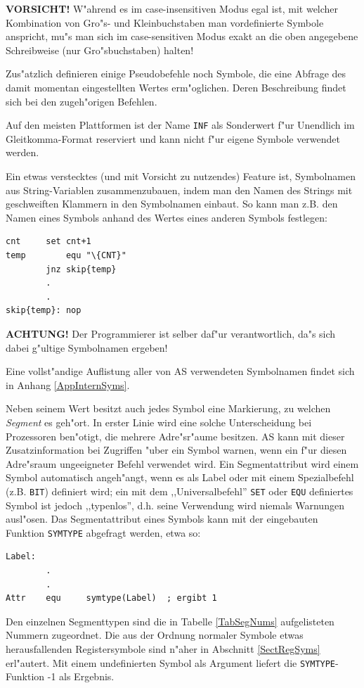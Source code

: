 \documentclass[12pt,a4paper,twoside]{report}
\newcommand{\bb}[1]{{\bf #1}}
\newcommand{\tty}[1]{{\tt #1}}
\newcommand{\asname}{AS}
\begin{document}
\bb{VORSICHT!}  W"ahrend es im case-insensitiven Modus egal ist,
mit welcher Kombination von Gro"s- und Kleinbuchstaben man
vordefinierte Symbole anspricht, mu"s man sich im case-sensitiven
Modus exakt an die oben angegebene Schreibweise (nur Gro"sbuchstaben)
halten!
\par
Zus"atzlich definieren einige Pseudobefehle noch Symbole, die eine
Abfrage des damit momentan eingestellten Wertes erm"oglichen.  Deren
Beschreibung findet sich bei den zugeh"origen Befehlen.
\par
Auf den meisten Plattformen ist der Name {\tt INF} als Sonderwert
f"ur Unendlich im Gleitkomma-Format reserviert und kann nicht
f"ur eigene Symbole verwendet werden.
\par
Ein etwas verstecktes (und mit Vorsicht zu nutzendes) Feature ist,
Symbolnamen aus String-Variablen zusammenzubauen, indem man den
Namen des Strings mit geschweiften Klammern in den Symbolnamen
einbaut.  So kann man z.B. den Namen eines Symbols anhand des
Wertes eines anderen Symbols festlegen:
\begin{verbatim}
cnt		set	cnt+1
temp		equ	"\{CNT}"
		jnz	skip{temp}
		.
		.
skip{temp}:	nop
\end{verbatim}
\bb{ACHTUNG!}  Der Programmierer ist selber daf"ur verantwortlich,
da"s sich dabei g"ultige Symbolnamen ergeben!
\par
Eine vollst"andige Auflistung aller von \asname{} verwendeten Symbolnamen
findet sich in Anhang \ref{AppInternSyms}.
\par
Neben seinem Wert besitzt auch jedes Symbol eine Markierung, zu welchen
{\em Segment} es geh"ort.  In erster Linie wird eine solche Unterscheidung
bei Prozessoren ben"otigt, die mehrere Adre"sr"aume besitzen.  \asname{} kann mit
dieser Zusatzinformation bei Zugriffen "uber ein Symbol warnen, wenn ein
f"ur diesen Adre"sraum ungeeigneter Befehl verwendet wird.  Ein
Segmentattribut wird einem Symbol automatisch angeh"angt, wenn es als Label
oder mit einem Spezialbefehl (z.B. \tty{BIT}) definiert wird; ein mit
dem ,,Universalbefehl'' \tty{SET} oder \tty{EQU} definiertes Symbol ist
jedoch ,,typenlos'', d.h. seine Verwendung wird niemals Warnungen
ausl"osen.  Das Segmentattribut eines Symbols kann mit der eingebauten
Funktion \tty{SYMTYPE} abgefragt werden, etwa so:
\begin{verbatim}
Label:
        .
        .
Attr    equ     symtype(Label)  ; ergibt 1
\end{verbatim}
Den einzelnen Segmenttypen sind die in Tabelle \ref{TabSegNums}
aufgelisteten Nummern zugeordnet.  Die aus der Ordnung normaler Symbole
etwas herausfallenden Registersymbole sind n"aher in Abschnitt
\ref{SectRegSyms} erl"autert.  Mit einem undefinierten Symbol als Argument
liefert die \tty{SYMTYPE}-Funktion -1 als Ergebnis.
\end{document}
